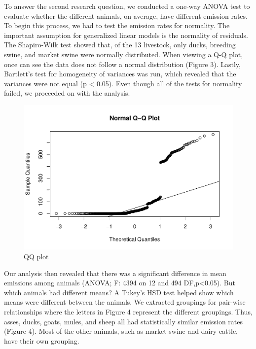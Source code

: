 \documentclass[
  12pt,
]{article}
\begin{document}
To answer the second research question, we conducted a one-way ANOVA
test to evaluate whether the different animals, on average, have
different emission rates. To begin this process, we had to test the
emission rates for normality. The important assumption for generalized
linear models is the normality of residuals. The Shapiro-Wilk test
showed that, of the 13 livestock, only ducks, breeding swine, and market
swine were normally distributed. When viewing a Q-Q plot, once can see
the data does not follow a normal distribution (Figure 3). Lastly,
Bartlett's test for homogeneity of variances was run, which revealed
that the variances were not equal (p \textless{} 0.05). Even though all
of the tests for normality failed, we proceeded on with the analysis.

\begin{figure}
\centering
\includegraphics{SultzerSwitFinalProject_files/figure-latex/unnamed-chunk-4-1.pdf}
\caption{QQ plot}
\end{figure}

Our analysis then revealed that there was a significant difference in
mean emissions among animals (ANOVA; F: 4394 on 12 and 494
DF,p\textless0.05). But which animals had different means? A Tukey's HSD
test helped show which means were different between the animals. We
extracted groupings for pair-wise relationships where the letters in
Figure 4 represent the different groupings. Thus, asses, ducks, goats,
mules, and sheep all had statistically similar emission rates (Figure
4). Most of the other animals, such as market swine and dairy cattle,
have their own grouping.
\end{document}
